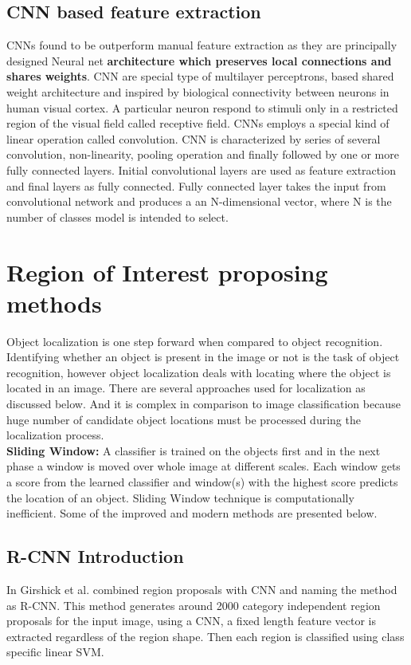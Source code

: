 \subsection{CNN based feature extraction}
\newpara CNNs found to be outperform manual feature extraction as they are principally designed Neural net \textbf{architecture which preserves local connections and shares weights}. CNN are special type of multilayer perceptrons, based shared weight architecture and inspired by biological connectivity between neurons in human visual cortex. A particular neuron respond to stimuli only in a restricted region of the visual field called receptive field. CNNs employs a special kind of linear operation called convolution. CNN is characterized by series of several convolution, non-linearity, pooling operation and finally followed by one or more fully connected layers. Initial convolutional layers are used as feature extraction and final layers as fully connected. Fully connected layer takes the input from convolutional network and produces a an N-dimensional vector, where N is the number of classes model is intended to select.


\section{Region of Interest proposing methods}
Object localization is one step forward when compared to object recognition. Identifying whether an object is present in the image or not is the task of object recognition, however object localization deals with locating where the object is located in an image. There are several approaches used for localization as discussed below. And it is complex in comparison to image classification because huge number of candidate object locations must be processed during the localization process. \\

\textbf{Sliding Window:} A classifier is trained on the objects first and in the next phase a window is moved over whole image at different scales. Each window gets a score from the learned classifier and window(s) with the highest score predicts the location of an object. Sliding Window technique is computationally inefficient. Some of the improved and modern methods are presented below. 

\subsection{R-CNN Introduction}
In \cite{girshick2014rich} Girshick et al. combined region proposals with CNN and naming the method as R-CNN. This method generates around 2000 category independent region proposals for the input image, using a CNN, a fixed length feature vector is extracted regardless of the region shape. Then each region is classified using class specific linear SVM. 


